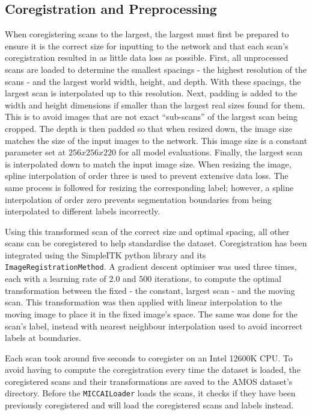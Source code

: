 \documentclass{l4proj}
\begin{document}
\subsection{Coregistration and Preprocessing}

When coregistering scans to the largest, the largest must first be prepared to ensure it is the correct size for inputting to the network and that each scan’s coregistration resulted in as little data loss as possible. First, all unprocessed scans are loaded to determine the smallest spacings - the highest resolution of the scans - and the largest world width, height, and depth. With these spacings, the largest scan is interpolated up to this resolution. Next, padding is added to the width and height dimensions if smaller than the largest real sizes found for them. This is to avoid images that are not exact “sub-scans” of the largest scan being cropped. The depth is then padded so that when resized down, the image size matches the size of the input images to the network. This image size is a constant parameter set at $256x256x220$ for all model evaluations. Finally, the largest scan is interpolated down to match the input image size. When resizing the image, spline interpolation of order three is used to prevent extensive data loss. The same process is followed for resizing the corresponding label; however, a spline interpolation of order zero prevents segmentation boundaries from being interpolated to different labels incorrectly.

Using this transformed scan of the correct size and optimal spacing, all other scans can be coregistered to help standardise the dataset. Coregistration has been integrated using the SimpleITK python library \citep{simpleitk1, simpleitk2, simpleitk3} and its \lstinline{ImageRegistrationMethod}. A gradient descent optimiser was used three times, each with a learning rate of $2.0$ and $500$ iterations, to compute the optimal transformation between the fixed - the constant, largest scan - and the moving scan. This transformation was then applied with linear interpolation to the moving image to place it in the fixed image’s space. The same was done for the scan’s label, instead with nearest neighbour interpolation used to avoid incorrect labels at boundaries.

Each scan took around five seconds to coregister on an Intel 12600K CPU. To avoid having to compute the coregistration every time the dataset is loaded, the coregistered scans and their transformations are saved to the AMOS dataset’s directory. Before the \lstinline{MICCAILoader} loads the scans, it checks if they have been previously coregistered and will load the coregistered scans and labels instead.
\end{document}
